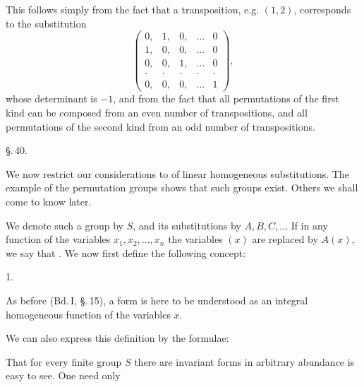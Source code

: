 
This follows simply from the fact that a transposition, e.g. $(1, 2)$, corresponds to the substitution
\[
\begin{pmatrix} 0, & 1, & 0, & \dots & 0 \\ 1, & 0, & 0, & \dots & 0 \\ 0, & 0, & 1, & \dots & 0 \\ \cdot & \cdot & \cdot & \cdot & \cdot \\ 0, & 0, & 0, & \dots & 1 \end{pmatrix},
\]
whose determinant is $-1$, and from the fact that all permutations of the first kind can be composed from an even number of transpositions, and all permutations of the second kind from an odd number of transpositions.

\begin{center}
\S.\,40.

\end{center}

We now restrict our considerations to  of linear homogeneous substitutions. The example of the permutation groups shows that such groups exist. Others we shall come to know later.

We denote such a group by $S$, and its substitutions by $A, B, C, \dots$ If in any function of the variables $x_1, x_2, \dots, x_n$ the variables $(x)$ are replaced by $A(x)$, we say that . We now first define the following concept:

1. 

As before (Bd.\,I, \S.\,15), a form is here to be understood as an integral homogeneous function of the variables $x$.

We can also express this definition by the formulae:

That for every finite group $S$ there are invariant forms in arbitrary abundance is easy to see. One need only

